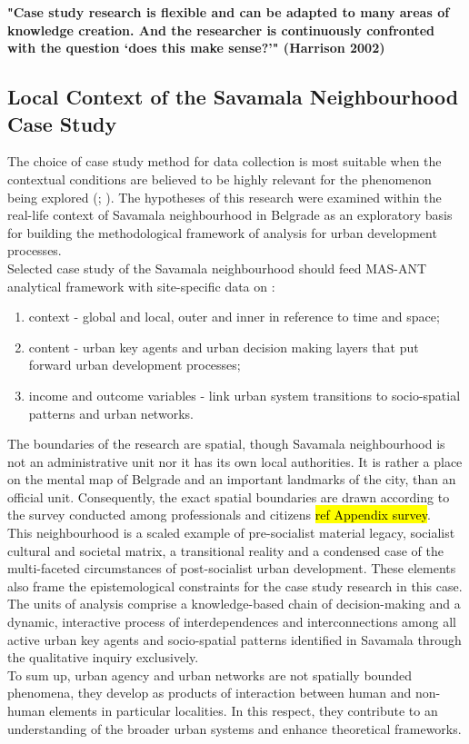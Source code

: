 \documentclass[11pt]{report}
\begin{document}
\textbf{"Case study research is flexible and can be adapted to many areas of knowledge creation. And the researcher is continuously confronted with the question ‘does this make sense?’" (Harrison 2002)}

\subsection{Local Context of the Savamala Neighbourhood Case Study}

The choice of case study method for data collection is most suitable when the  contextual  conditions  are  believed  to  be highly relevant for the phenomenon being explored (\cite{Robson, 1993}; \cite{Yin, 1994}). The hypotheses of this research were examined within the real-life context of Savamala neighbourhood in Belgrade as an exploratory basis for building the methodological framework of analysis for urban development processes. 
\\
Selected case study of the Savamala neighbourhood  should feed MAS-ANT analytical framework with site-specific data on :
\begin{enumerate}
\item context - global and local, outer and inner in reference to time and space;
\item content - urban key agents and urban decision making layers that put forward urban development processes;
\item income and outcome variables - link urban system transitions to socio-spatial patterns and urban networks.
\end{enumerate}

The boundaries of the research are spatial, though Savamala neighbourhood is not an administrative unit nor it has its own local authorities. It is rather a place on the mental map of Belgrade and an important landmarks of the city, than an official unit. Consequently, the exact spatial boundaries are drawn according to the survey conducted among professionals and citizens \hl{ref Appendix survey}.
\\
This neighbourhood is a scaled example of pre-socialist material legacy, socialist cultural and societal matrix, a transitional reality and a condensed case of the multi-faceted circumstances of post-socialist urban development. These elements also frame the epistemological constraints for the case study research in this case.
\\
The units of analysis comprise a knowledge-based chain of decision-making and a dynamic, interactive process of interdependences and interconnections among all active urban key agents and socio-spatial patterns identified in Savamala through the qualitative inquiry exclusively.
\\
To sum up, urban agency and urban networks are not spatially bounded phenomena, they develop as products of interaction between human and non-human elements in particular localities. In this respect, they contribute to an understanding of the broader urban systems and enhance theoretical frameworks. 
\end{document}

